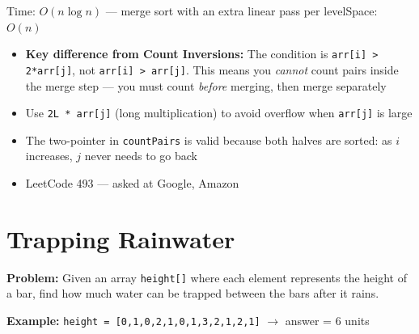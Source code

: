 \documentclass[12pt,a4paper,oneside]{book}
\begin{document}
\begin{complexity}
Time: $O(n \log n)$ --- merge sort with an extra linear pass per level\quad Space: $O(n)$
\end{complexity}

\begin{interviewcorner}
\begin{itemize}
  \item \textbf{Key difference from Count Inversions:} The condition is \texttt{arr[i] > 2*arr[j]}, not \texttt{arr[i] > arr[j]}. This means you \textit{cannot} count pairs inside the merge step --- you must count \textit{before} merging, then merge separately
  \item Use \texttt{2L * arr[j]} (long multiplication) to avoid overflow when \texttt{arr[j]} is large
  \item The two-pointer in \texttt{countPairs} is valid because both halves are sorted: as $i$ increases, $j$ never needs to go back
  \item LeetCode 493 --- asked at Google, Amazon
\end{itemize}
\end{interviewcorner}

\section{Trapping Rainwater}

\textbf{Problem:} Given an array \texttt{height[]} where each element represents the height of a bar, find how much water can be trapped between the bars after it rains.

\textbf{Example:} \texttt{height = [0,1,0,2,1,0,1,3,2,1,2,1]} $\to$ answer = 6 units

\begin{center}
\end{center}
\end{document}
